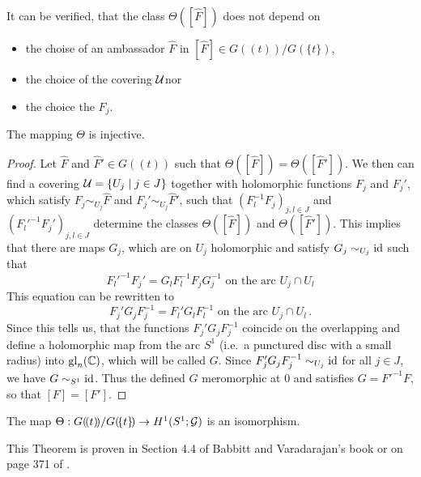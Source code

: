 It can be verified, that the class $\Theta([\hat F])$ does not depend on
\begin{itemize}
  \item the choise of an ambassador $\hat F$ in
    $[\hat F]\in G(\!(t)\!)/G(\!\{t\}\!)$\PROBLEM[proof!],
  \item the choice of the covering $\mathcal{U}$\PROBLEM[proof!] nor
  \item the choice the $F_j$\PROBLEM[proof!].
\end{itemize}
\begin{lem}
  The mapping $\Theta$ is injective.
\end{lem}
\begin{proof}
  Let $\hat F$ and $\hat F'\in G(\!(t)\!)$ such that
  $\Theta([\hat F])=\Theta([\hat F'])$.
  We then can find a covering $\mathcal{U}=\{U_j\mid j\in J\}$ together with
  holomorphic functions $F_j$ and $F_j'$, which satisfy
  $F_j\sim_{U_j}\hat F$ and $F_j'\sim_{U_j}\hat F'$, such that
  $(F_l^{-1}F_j)_{j,l\in J}$ and $(F_l'^{-1}F_j')_{j,l\in J}$ determine the
  classes $\Theta([\hat F])$ and $\Theta([\hat F'])$.
  This implies that there are maps $G_j$, which are on $U_j$ holomorphic and
  satisfy $G_j\sim_{U_j}\operatorname{id}$ such that
  \[
    F_l'^{-1}F_j'=G_lF_l^{-1}F_jG_j^{-1}
    \text{~on~the~arc~} U_j\cap U_l
  \]
  This equation can be rewritten to
  \[
    F_j'G_jF_j^{-1}=F_l'G_lF_l^{-1}
    \text{~on~the~arc~} U_j\cap U_l \,.
  \]
  Since this tells us, that the functions $F_j'G_jF_j^{-1}$ coincide on
  the overlapping and define a holomorphic map from the arc $S^1$ (i.e.\ a
  punctured disc with a small radius) into $\operatorname{gl}_n(\mathbb{C})$, which will be called
  $G$.
  Since $F_j'G_jF_j^{-1}\sim_{U_j}\operatorname{id}$ for all $j\in J$, we have
  $G\sim_{S^1}\operatorname{id}$.
  Thus the defined $G$ meromorphic at $0$ and satisfies $G=F'^{-1}F$, so that
  $[F]=[F']$.
\end{proof}
\begin{thm}\label{thm:thm1helpMalgSibuy}
  The map $\Theta:G(\!(t)\!)/G(\!\{t\}\!)\to H^1(S^1;\mathcal{G})$ is an isomorphism.
\end{thm}
This Theorem is proven in Section 4.4 of Babbitt and Varadarajan's book
\cite{babbitt1989local} or on page 371 of \cite{Martinet1991}.

